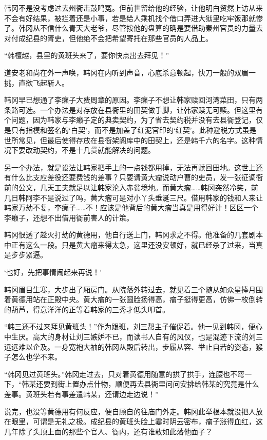 韩冈不是没考虑过去州衙击鼓鸣冤。但前世留给他的经验，让他明白贸然上访从来不会有好结果，被拦着还是小事，若是给人乘机找个借口弄进大狱里吃牢饭那就惨了。韩冈从不信什么青天大老爷，尽管按他的盘算的确是要借助秦州官员的力量去对付成纪县的胥吏，但他绝不会把希望寄托在那些官员的人品上。

“韩檀越，县里的黄班头来了，要你快点出去拜见！”

道安老和尚在外一声唤，韩冈在内听到声音，心底杀意顿起，快刀一般的双眉一挑，直欲飞起斩人。

韩冈早已想通了李癞子大费周章的原因。李癞子不想让韩家赎回河湾菜田，只有两条路可选。一个办法是对存放在县衙里的田契做手脚，让韩家赎无可赎。但这里有个问题，因为韩家与李癞子定的典卖契约，为了省去契约税并没有去县衙登记，仅是只有指模和签名的‘白契’，而不是加盖了红泥官印的‘红契’。此种避税方式虽是世所常见，但最后使得存放在县衙架阁库中的田契上，还是韩千六的名字。这种情况下要改动契约，不是十几贯就能解决的问题。

另一个办法，就是设法让韩家把手上的一点钱都用掉，无法再赎回田地。这世上还有什么比支应差役还要费钱的差事？只要请黄大瘤说动户曹的吏员，发一张征调衙前的公文，几天工夫就足以让韩家沦入赤贫境地。而黄大瘤……韩冈突然冷笑，前几日韩阿李不是说过了吗，黄大瘤可是对小丫头垂涎三尺。借用韩家的钱和人来让韩家万劫不复，李癞子……不！应该是他背后的黄大瘤当真是用得好计！区区一个李癞子，还想不出借用衙前害人的计策。

韩冈恨透了趁火打劫的黄德用，他自行送上门，韩冈求之不得。他准备的几套剧本中正有这么一段。只是黄大瘤来得太急，这里还没安顿好，就已经杀了过来，当真是步步紧逼。

‘也好，先把事情闹起来再说！’

韩冈眉目生寒，大步出了厢房门。从院落外转过去，就见着三个随从如众星捧月围着黄德用站在正殿中央。黄大瘤的一张圆脸扬得高，瘤子挺得更高，仿佛一枚倒转的葫芦，得意洋洋的正等着韩家的三秀才低头叩首。

“韩三还不过来拜见黄班头！”作为跟班，刘三帮主子催促着。他一见到韩冈，便心中生厌。高大的身材让刘三嫉妒不已，而读书人自有的风仪，也是混迹下流的刘三远远难以企及。一身宽袍大袖的韩冈从殿后转出，步履从容、举止自若的姿态，猴子怎么也学不来。

“韩冈见过黄班头。”韩冈走过去，只对着黄德用随意的拱了拱手，连腰也不弯一下，“韩某还要到街上置办点什物，顺便再去县衙里问问安排给韩某的究竟是什么差事。黄班头若有事差遣韩某，还请边走边说！”

说完，也没等黄德用有何反应，便自顾自的往庙门外走。韩冈此举根本就没把人放在眼里，可谓是无礼之极。成纪县的黄班头脸上霎时阴云密布，瘤子涨得血红，这几年除了头顶上面的那些个官人、衙内，还有谁敢如此落他面子？


